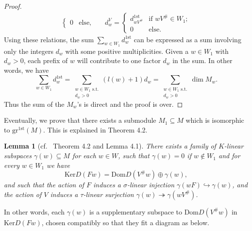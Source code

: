 \documentclass[12pt]{amsart}
\newtheorem{lemma}[theorem]{Lemma}
\theoremstyle{definition}
\newcommand{\<}{\langle}   %
\renewcommand{\>}{\rangle} %
\begin{document}
\begin{proof}
\begin{align*}
\begin{cases}
            0 & \text{else},
        \end{cases}
        & & 
        d_w^V = \begin{cases}
            d_{wV^{\#}}^{1\mathrm{st}} & \text{if } wV^{\#} \in W_1;\\
            0 & \text{else}.
        \end{cases}
    \end{align*}
    Using these relations, the sum $\sum_{w \in W_1} d_w^{1\mathrm{st}}$ can be expressed as a sum involving only the integers $d_w$ with some positive multiplicities. Given a $w \in W_1$ with $d_w > 0$, each prefix of $w$ will contribute to one factor $d_w$ in the sum. In other words, we have 
    \begin{equation*}
        \sum_{w \in W_1} d_w^{1\mathrm{st}} = \sum_{\substack{w \in W_1 \text{ s.t.} \\ d_w > 0}} (l(w)+1)d_w = \sum_{\substack{w \in W_1 \text{ s.t.} \\ d_w > 0}} \dim M_w.
    \end{equation*}
    Thus the sum of the $M_w$'s is direct and the proof is over.
\end{proof}

Eventually, we prove that there exists a submodule $M_1 \subseteq  M$ which is isomorphic to $\mathrm{gr}^{1\mathrm{st}}(M)$. This is explained in \cite{gelfand-ponomarev:1968} Theorem 4.2. 

\begin{lemma}[cf.~\cite{gelfand-ponomarev:1968} Theorem 4.2 and Lemma 4.1]
    There exists a family of $K$-linear subspaces $\gamma(w) \subseteq  M$ for each $w \in W$, such that $\gamma(w) = 0$ if $w \not \in W_1$ and for every $w \in W_1$ we have 
    \begin{equation*}
        \mathrm{Ker}D(Fw) = \mathrm{Dom}D(V^{\#}w) \oplus \gamma(w),
    \end{equation*}
    and such that the action of $F$ induces a $\sigma$-linear injection $\gamma(wF) \hookrightarrow \gamma(w)$, and the action of $V$ induces a $\tau$-linear surjection $\gamma(w) \twoheadrightarrow \gamma(wV^{\#})$. 
\end{lemma}

In other words, each $\gamma(w)$ is a supplementary subspace to $\mathrm{Dom}D(V^{\#}w)$ in $\mathrm{Ker}D(Fw)$, chosen compatibly so that they fit a diagram as below.
\begin{center}
\end{center}
\end{document}
